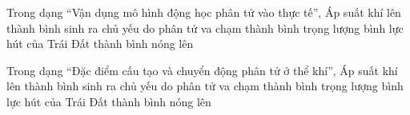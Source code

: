 \begin{ex}
Trong dạng “Vận dụng mô hình động học phân tử vào thực tế”, Áp suất khí lên thành bình sinh ra chủ yếu do
\choice
{\True phân tử va chạm thành bình}
{trọng lượng bình}
{lực hút của Trái Đất}
{thành bình nóng lên}
\end{ex}

\begin{ex}
Trong dạng “Đặc điểm cấu tạo và chuyển động phân tử ở thể khí”, Áp suất khí lên thành bình sinh ra chủ yếu do
\choice
{\True phân tử va chạm thành bình}
{trọng lượng bình}
{lực hút của Trái Đất}
{thành bình nóng lên}
\end{ex}
